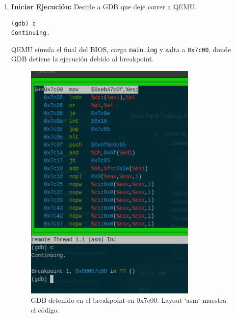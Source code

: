 \begin{enumerate}[noitemsep]
    \item \textbf{Iniciar Ejecución:} Decirle a GDB que deje correr a QEMU.
        \begin{lstlisting}[style=GdbStyle]
(gdb) c
Continuing.
        \end{lstlisting}
        QEMU simula el final del BIOS, carga \texttt{main.img} y salta a \texttt{0x7c00}, donde GDB detiene la ejecución debido al breakpoint.
        \begin{figure}[H]
            \centering
            \includegraphics[width=0.8\textwidth]{images/break7C00.png}
            \caption{GDB detenido en el breakpoint en 0x7c00. Layout `asm` muestra el código.}
        \end{figure}


\end{enumerate}
